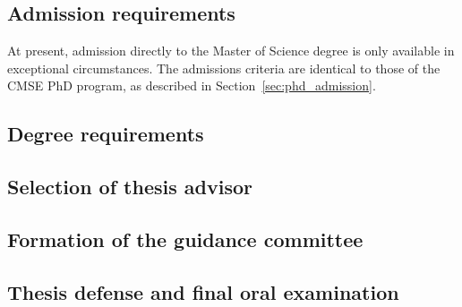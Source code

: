 \subsection{Admission requirements}

At present, admission directly to the Master of Science degree is only
available in exceptional circumstances.  The admissions criteria are
identical to those of the CMSE PhD program, as described in
Section~\ref{sec:phd_admission}.

\subsection{Degree requirements}

\subsection{Selection of thesis advisor}

\subsection{Formation of the guidance committee}

\subsection{Thesis defense and final oral examination}
